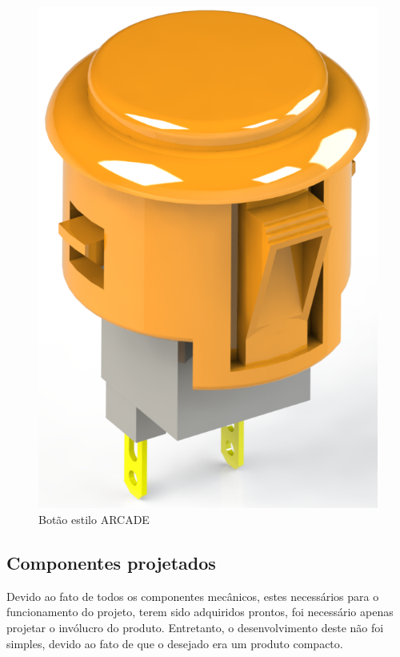 \begin{itemize}
                    \begin{figure}[H]
                    	\centering
                    	\includegraphics[scale=0.2]{Imagens/SW_Images/arcade_button.png}
                    	\caption[Botão estilo ARCADE]{Botão estilo ARCADE}
                    	\label{fig:Arcade_button}
                    \end{figure}
            \end{itemize}
            
        \subsection{Componentes projetados}
        
            Devido ao fato de todos os componentes mecânicos, estes necessários para o funcionamento do projeto, terem sido adquiridos prontos, foi necessário apenas projetar o invólucro do produto. Entretanto, o desenvolvimento deste não foi simples, devido ao fato de que o desejado era um produto compacto.
            
